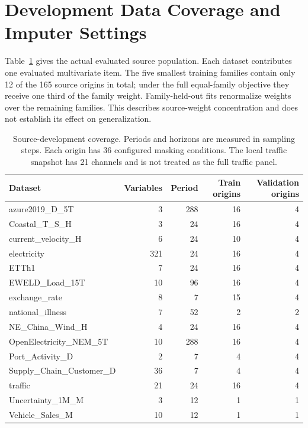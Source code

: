 \section{Development Data Coverage and Imputer Settings}
\label{app:source}

Table~\ref{tab:source-inventory} gives the actual evaluated source population. Each dataset contributes one evaluated multivariate item. The five smallest training families contain only 12 of the 165 source origins in total; under the full equal-family objective they receive one third of the family weight. Family-held-out fits renormalize weights over the remaining families. This describes source-weight concentration and does not establish its effect on generalization.

\begin{table}[h]
\centering\small
\caption{Source-development coverage. Periods and horizons are measured in sampling steps. Each origin has 36 configured masking conditions. The local traffic snapshot has 21 channels and is not treated as the full traffic panel.}
\label{tab:source-inventory}
\begin{tabular}{lrrrr}
\toprule
Dataset & Variables & Period & Train origins & Validation origins\\
\midrule
azure2019\_D\_5T & 3 & 288 & 16 & 4\\
Coastal\_T\_S\_H & 3 & 24 & 16 & 4\\
current\_velocity\_H & 6 & 24 & 10 & 4\\
electricity & 321 & 24 & 16 & 4\\
ETTh1 & 7 & 24 & 16 & 4\\
EWELD\_Load\_15T & 10 & 96 & 16 & 4\\
exchange\_rate & 8 & 7 & 15 & 4\\
national\_illness & 7 & 52 & 2 & 2\\
NE\_China\_Wind\_H & 4 & 24 & 16 & 4\\
OpenElectricity\_NEM\_5T & 10 & 288 & 16 & 4\\
Port\_Activity\_D & 2 & 7 & 4 & 4\\
Supply\_Chain\_Customer\_D & 36 & 7 & 4 & 4\\
traffic & 21 & 24 & 16 & 4\\
Uncertainty\_1M\_M & 3 & 12 & 1 & 1\\
Vehicle\_Sales\_M & 10 & 12 & 1 & 1\\
\bottomrule
\end{tabular}
\end{table}

